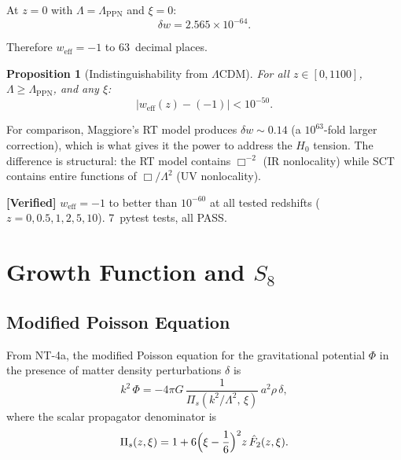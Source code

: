 \documentclass[11pt,a4paper]{article}
\newcommand{\Lam}{\Lambda}
\theoremstyle{plain}
\newtheorem{proposition}[theorem]{Proposition}
\theoremstyle{definition}
\newcommand{\verified}[1]{%
  \par\smallskip\noindent
  \colorbox{green!10}{\parbox{\dimexpr\linewidth-2\fboxsep}{%
    \textcolor{green!50!black}{\textbf{[Verified]}} #1}}%
  \par\smallskip}
\begin{document}
At $z = 0$ with $\Lam = \Lam_{\mathrm{PPN}}$ and $\xi = 0$:
\begin{equation}\label{eq:delta-w-value}
  \boxed{
  \delta w = 2.565 \times 10^{-64}.
  }
\end{equation}

Therefore $w_{\mathrm{eff}} = -1$ to 63~decimal places.

\begin{proposition}[Indistinguishability from $\Lam$CDM]
For all $z \in [0, 1100]$, $\Lam \geq \Lam_{\mathrm{PPN}}$, and any
$\xi$:
\begin{equation}
  |w_{\mathrm{eff}}(z) - (-1)| < 10^{-50}.
\end{equation}
\end{proposition}

For comparison, Maggiore's RT model produces
$\delta w \sim 0.14$ (a $10^{63}$-fold larger correction), which is what
gives it the power to address the $H_0$ tension. The difference is
structural: the RT model contains $\Box^{-2}$ (IR nonlocality) while
SCT contains entire functions of $\Box/\Lam^2$ (UV nonlocality).

\verified{$w_{\mathrm{eff}} = -1$ to better than $10^{-60}$ at all
tested redshifts ($z = 0, 0.5, 1, 2, 5, 10$). 7~pytest tests, all
PASS.}

\section{Growth Function and $S_8$}\label{sec:growth}

\subsection{Modified Poisson Equation}

From NT-4a, the modified Poisson equation for the gravitational
potential $\Phi$ in the presence of matter density perturbations $\delta$
is
\begin{equation}\label{eq:poisson-mod}
  k^2\,\Phi = -4\pi G\,\frac{1}{\Pi_s(k^2/\Lam^2,\,\xi)}\,a^2\rho\,\delta,
\end{equation}
where the scalar propagator denominator is
\begin{equation}\label{eq:Pi-s}
  \Pi_s(z,\xi) = 1 + 6\Bigl(\xi - \frac{1}{6}\Bigr)^2 z\,\hat{F}_2(z,\xi).
\end{equation}
\end{document}
